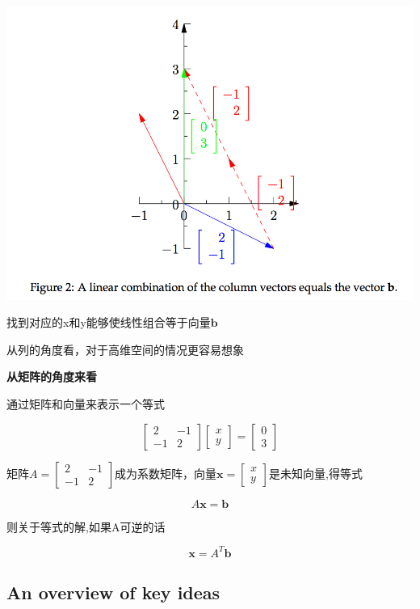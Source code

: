 \documentclass{ctexart}
\begin{document}
	\begin{center}
		\includegraphics[width=0.8\linewidth]{pic/linear_combination}
	\end{center}

	找到对应的x和y能够使线性组合等于向量\(\bm{b}\)
	
	从列的角度看，对于高维空间的情况更容易想象
	
	\textbf{从矩阵的角度来看}
	
	通过矩阵和向量来表示一个等式
	
	\[\begin{bmatrix}
	2 & -1 \\
	-1 & 2
	\end{bmatrix}
	\begin{bmatrix}
	x \\ y
	\end{bmatrix}=
	\begin{bmatrix}
	0 \\ 3
	\end{bmatrix}\]
	
	矩阵\(A = \begin{bmatrix}
	2 & -1 \\
	-1 & 2
	\end{bmatrix}\)成为系数矩阵，向量\(\bm{x}=\begin{bmatrix}
	x \\ y
	\end{bmatrix}\)是未知向量,得等式
	
	\[A\bm{x = b}\]
	
	则关于等式的解,如果A可逆的话
	
	\[\bm{x} = A^T\bm{b}\]

	\subsection{An overview of key ideas}
	
\end{document}

